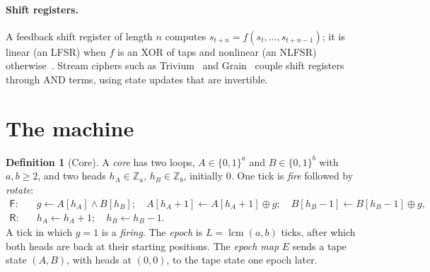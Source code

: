 \documentclass[11pt]{article}
\theoremstyle{definition}
\newtheorem{definition}[theorem]{Definition}
\theoremstyle{remark}
\newcommand{\xor}{\oplus}
\newcommand{\lcm}{\operatorname{lcm}}
\begin{document}
\paragraph{Shift registers.}
A feedback shift register of length $n$ computes $s_{t+n}=f(s_t,\dots,
s_{t+n-1})$; it is linear (an LFSR) when $f$ is an XOR of taps and
nonlinear (an NLFSR) otherwise~\cite{golomb1967}. Stream ciphers such as
Trivium~\cite{decanniere2008} and Grain~\cite{hell2007} couple shift
registers through AND terms, using state updates that are invertible.

\section{The machine}
\label{sec:machine}

\begin{definition}[Core]
\label{def:core}
A \emph{core} has two loops, $A\in\{0,1\}^a$ and $B\in\{0,1\}^b$ with
$a,b\ge2$, and two heads $h_A\in\mathbb{Z}_a$, $h_B\in\mathbb{Z}_b$,
initially $0$. One tick is \emph{fire} followed by \emph{rotate}:
\begin{align*}
\textsf{F}:\quad & g \gets A[h_A]\wedge B[h_B];\quad
  A[h_A+1]\gets A[h_A+1]\xor g;\quad B[h_B-1]\gets B[h_B-1]\xor g,\\
\textsf{R}:\quad & h_A\gets h_A+1;\quad h_B\gets h_B-1.
\end{align*}
A tick in which $g=1$ is a \emph{firing}. The \emph{epoch} is
$L=\lcm(a,b)$ ticks, after which both heads are back at their starting
positions. The \emph{epoch map} $E$ sends a tape state $(A,B)$, with
heads at $(0,0)$, to the tape state one epoch later.
\end{definition}
\end{document}
